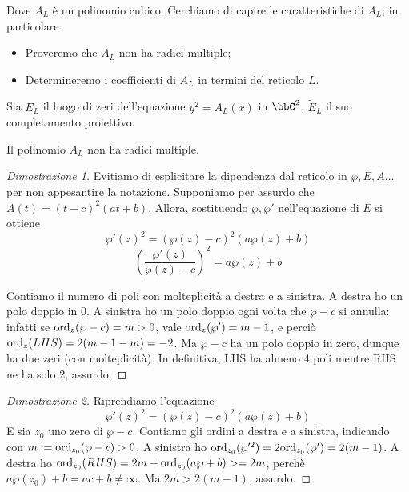 Dove $A_L$ è un polinomio cubico. Cerchiamo di capire le caratteristiche di $A_L$; in particolare
\begin{itemize}
\item Proveremo che $A_L$ non ha radici multiple;
\item Determineremo i coefficienti di $A_L$ in termini del reticolo $L$.
\end{itemize}

Sia $E_L$ il luogo di zeri dell'equazione $y^2=A_L(x)$ in $\bbC^2$, $\tilde{E}_L$ il suo completamento proiettivo.
\begin{proposizione}
Il polinomio $A_L$ non ha radici multiple.
\end{proposizione}

\begin{proof}[Dimostrazione 1]
Evitiamo di esplicitare la dipendenza dal reticolo in $\wp, E,A \dots$ per non appesantire la notazione. Supponiamo per assurdo che $A(t) = (t-c)^2(at+b)$. Allora, sostituendo $\wp, \wp'$ nell'equazione di $E$ si ottiene
$$\wp'(z)^2 = (\wp(z) - c)^2(a\wp(z)+b) $$
$$ \left ( \frac{\wp'(z)}{\wp(z)-c} \right )^2 = a\wp(z)+b $$

Contiamo il numero di poli con molteplicità a destra e a sinistra. A destra ho un polo doppio in $0$. A sinistra ho un polo doppio ogni volta che $\wp - c$ si annulla: infatti se $\text{ord}_{z}(\wp -c) = m > 0$, vale $\text{ord}_{z}(\wp') = m-1$, e perciò $\text{ord}_{z}(LHS) = 2(m-1-m) = -2$. Ma $\wp-c$ ha un polo doppio in zero, dunque ha due zeri (con molteplicità). In definitiva, LHS ha almeno 4 poli mentre RHS ne ha solo 2, assurdo.
\end{proof}

\begin{proof}[Dimostrazione 2]
Riprendiamo l'equazione
$$\wp'(z)^2 = (\wp(z) - c)^2(a\wp(z)+b) $$
E sia $z_0$ uno zero di $\wp-c$. Contiamo gli ordini a destra e a sinistra, indicando con $m:=\text{ord}_{z_0}(\wp-c) > 0$.
A sinistra ho $\text{ord}_{z_0}( \wp'^2) = 2\text{ord}_{z_0}( \wp') = 2(m-1)$. A destra ho $\text{ord}_{z_0}(RHS) = 2m + \text{ord}_{z_0}(a\wp+b) >= 2m$, perchè $a \wp(z_0)+b = ac+b \neq \infty$. Ma $2m> 2(m-1)$, assurdo.
\end{proof}

